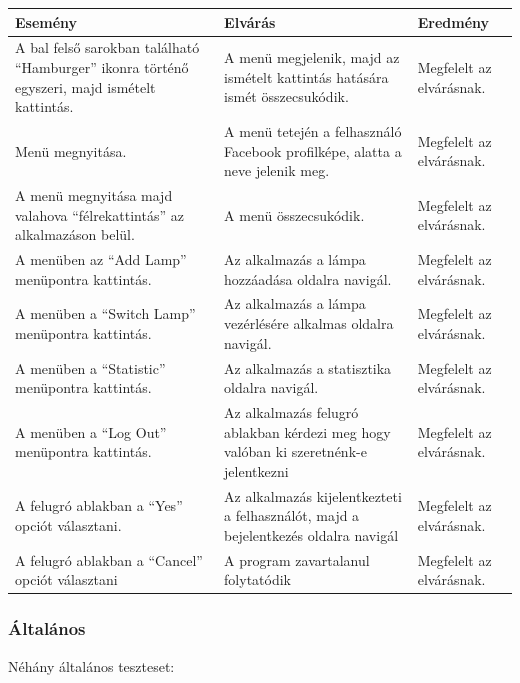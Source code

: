 \documentclass[a4paper,12pt]{report}
\begin{document}
\begin{center}
    \begin{tabular}{ | m{4.5cm} | m{4.5cm} | m{4.5cm} |}
        \hline
        Esemény & Elvárás & Eredmény \\ \hline
        A bal felső sarokban található ``Hamburger'' ikonra történő egyszeri, majd ismételt kattintás. & A menü megjelenik, majd az ismételt kattintás
        hatására ismét összecsukódik. & Megfelelt az elvárásnak.\\ \hline
        Menü megnyitása. & A menü tetején a felhasználó Facebook profilképe, alatta a neve jelenik meg. & Megfelelt az elvárásnak.\\ \hline
        A menü megnyitása majd valahova ``félrekattintás'' az alkalmazáson belül. & A menü összecsukódik. & Megfelelt az elvárásnak.\\ \hline
        A menüben az ``Add Lamp'' menüpontra kattintás. & Az alkalmazás a lámpa hozzáadása oldalra navigál. & Megfelelt az elvárásnak.\\ \hline
        A menüben a ``Switch Lamp'' menüpontra kattintás. & Az alkalmazás a lámpa vezérlésére alkalmas oldalra navigál. & Megfelelt az elvárásnak.\\ \hline
        A menüben a ``Statistic'' menüpontra kattintás. & Az alkalmazás a statisztika oldalra navigál. & Megfelelt az elvárásnak.\\ \hline
        A menüben a ``Log Out'' menüpontra kattintás. & Az alkalmazás felugró ablakban kérdezi meg hogy valóban ki szeretnénk-e jelentkezni &
        Megfelelt az elvárásnak.\\ \hline
        A felugró ablakban a ``Yes'' opciót választani. & Az alkalmazás kijelentkezteti a felhasználót, majd a bejelentkezés oldalra navigál &
        Megfelelt az elvárásnak.\\ \hline
        A felugró ablakban a ``Cancel'' opciót választani & A program zavartalanul folytatódik & Megfelelt az elvárásnak.\\ \hline
        \hline
    \end{tabular}
\end{center}

\subsubsection{Általános}
    Néhány általános teszteset:
\end{document}
